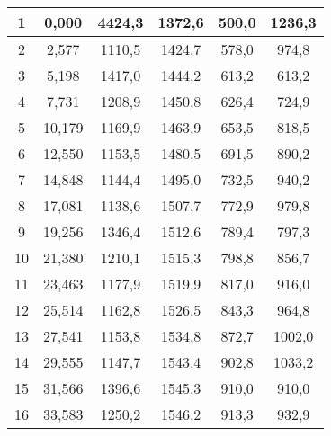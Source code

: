 \begin{enumerate}
\begin{longtable}{|c|c|c|c|c|c|}
			1 & 
			0,000 & 
			4424,3 & 
			1372,6 &
			500,0 & 
			1236,3  
			\\\hline
		
			2 & 
			2,577 & 
			1110,5 & 
			1424,7 &
			578,0 & 
			974,8  
			\\\hline
		
			3 & 
			5,198 & 
			1417,0 & 
			1444,2 &
			613,2 & 
			613,2  
			\\\hline
		
			4 & 
			7,731 & 
			1208,9 & 
			1450,8 &
			626,4 & 
			724,9  
			\\\hline
		
			5 & 
			10,179 & 
			1169,9 & 
			1463,9 &
			653,5 & 
			818,5  
			\\\hline
		
			6 & 
			12,550 & 
			1153,5 & 
			1480,5 &
			691,5 & 
			890,2  
			\\\hline
		
			7 & 
			14,848 & 
			1144,4 & 
			1495,0 &
			732,5 & 
			940,2  
			\\\hline
		
			8 & 
			17,081 & 
			1138,6 & 
			1507,7 &
			772,9 & 
			979,8  
			\\\hline
		
			9 & 
			19,256 & 
			1346,4 & 
			1512,6 &
			789,4 & 
			797,3  
			\\\hline
		
			10 & 
			21,380 & 
			1210,1 & 
			1515,3 &
			798,8 & 
			856,7  
			\\\hline
		
			11 & 
			23,463 & 
			1177,9 & 
			1519,9 &
			817,0 & 
			916,0  
			\\\hline
		
			12 & 
			25,514 & 
			1162,8 & 
			1526,5 &
			843,3 & 
			964,8  
			\\\hline
		
			13 & 
			27,541 & 
			1153,8 & 
			1534,8 &
			872,7 & 
			1002,0  
			\\\hline
		
			14 & 
			29,555 & 
			1147,7 & 
			1543,4 &
			902,8 & 
			1033,2  
			\\\hline
		
			15 & 
			31,566 & 
			1396,6 & 
			1545,3 &
			910,0 & 
			910,0  
			\\\hline
		
			16 & 
			33,583 & 
			1250,2 & 
			1546,2 &
			913,3 & 
			932,9  
			\\\hline
		

\end{longtable}
\end{enumerate}
